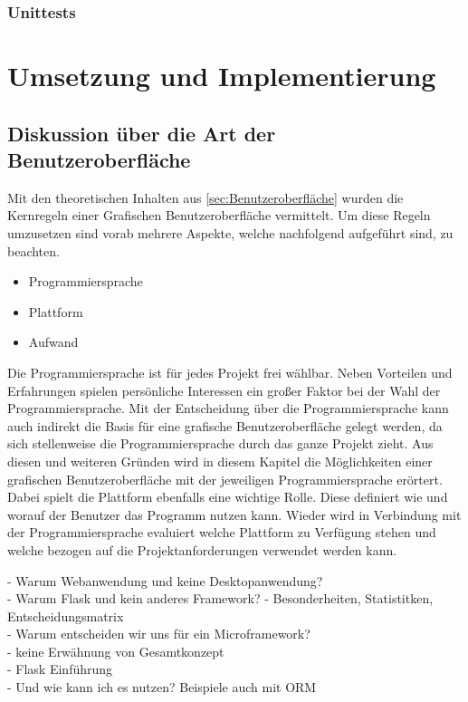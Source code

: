 \documentclass[a4paper,titlepage,halfparskip,12pt]{scrreprt}
\begin{document}
\begin{onehalfspacing}
\subsection{Unittests}
\label{Unittests}

\chapter{Umsetzung und Implementierung}
\label{chap:Umsetzung}

\section{Diskussion über die Art der Benutzeroberfläche}
\label{sec:DiskussionGUI}

Mit den theoretischen Inhalten aus \autoref{sec:Benutzeroberfläche} wurden die Kernregeln einer Grafischen Benutzeroberfläche vermittelt. Um diese Regeln umzusetzen sind vorab mehrere Aspekte, welche nachfolgend aufgeführt sind, zu beachten.
\begin{itemize}
	\item Programmiersprache
	\item Plattform
	\item Aufwand
\end{itemize}
Die Programmiersprache ist für jedes Projekt frei wählbar. Neben Vorteilen und Erfahrungen spielen persönliche Interessen ein großer Faktor bei der Wahl der Programmiersprache. Mit der Entscheidung über die Programmiersprache kann auch indirekt die Basis für eine grafische Benutzeroberfläche gelegt werden, da sich stellenweise die Programmiersprache durch das ganze Projekt zieht. Aus diesen und weiteren Gründen wird in diesem Kapitel die Möglichkeiten einer grafischen Benutzeroberfläche mit der jeweiligen Programmiersprache erörtert. Dabei spielt die Plattform ebenfalls eine wichtige Rolle. Diese definiert wie und worauf der Benutzer das Programm nutzen kann. Wieder wird in Verbindung mit der Programmiersprache evaluiert welche Plattform zu Verfügung stehen und welche bezogen auf die Projektanforderungen verwendet werden kann.

- Warum Webanwendung und keine Desktopanwendung?\\
- Warum Flask und kein anderes Framework? - Besonderheiten, Statistitken, Entscheidungsmatrix\\
- Warum entscheiden wir uns für ein Microframework?\\
- keine Erwähnung von Gesamtkonzept\\
- Flask Einführung\\
- Und wie kann ich es nutzen? Beispiele auch mit ORM\\


\end{onehalfspacing}
\end{document}
